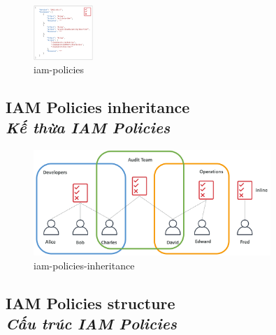 \begin{figure}[htbp]
	\centering
	\includegraphics[width=0.2\textwidth]{images/iam-policies}
	\caption{iam-policies}
	\label{fig:iam-policies}
\end{figure}

\subsection[IAM Policies inheritance]{IAM Policies inheritance \\ \textit{Kế thừa IAM Policies}}

\begin{figure}[htbp]
	\centering
	\includegraphics[width=0.8\textwidth]{images/iam-policies-inheritance}
	\caption{iam-policies-inheritance}
	\label{fig:iam-policies-inheritance}
\end{figure}

\subsection[IAM Policies structure]{IAM Policies structure \\ \textit{Cấu trúc IAM Policies}}

